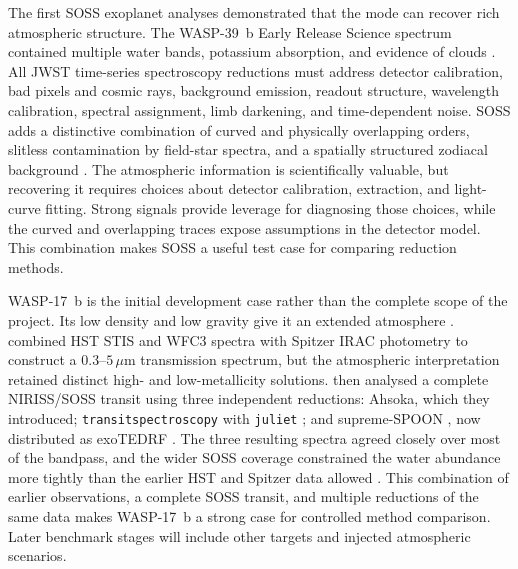
The first SOSS exoplanet analyses demonstrated that the mode can recover rich
atmospheric structure. The WASP-39~b Early Release Science spectrum contained
multiple water bands, potassium absorption, and evidence of clouds
\citep{FeinsteinEtAl2023}. All JWST time-series spectroscopy reductions must
address detector calibration, bad pixels and cosmic rays, background emission,
readout structure, wavelength calibration, spectral assignment, limb darkening,
and time-dependent noise. SOSS adds a distinctive combination of curved and
physically overlapping orders, slitless contamination by field-star spectra,
and a spatially structured zodiacal background
\citep{BellEtAl2022,RadicaEtAl2023,HolmbergMadhusudhan2023}. The atmospheric information is
scientifically valuable, but recovering it requires choices about detector
calibration, extraction, and light-curve fitting. Strong signals provide
leverage for diagnosing those choices, while the curved and overlapping traces
expose assumptions in the detector model. This combination makes SOSS a useful
test case for comparing reduction methods.


WASP-17~b is the initial development case rather than the complete scope of the
project. Its low density and low gravity give it an extended atmosphere
\citep{AndersonEtAl2010}. \citet{AldersonEtAl2022} combined HST STIS and WFC3
spectra with Spitzer IRAC photometry to construct a
$0.3$--$5\,\mu\mathrm{m}$ transmission spectrum, but the atmospheric
interpretation retained distinct high- and low-metallicity solutions.
\citet{LouieEtAl2025} then analysed a complete NIRISS/SOSS transit using three
independent reductions: Ahsoka, which they introduced;
\texttt{transitspectroscopy} \citep{Espinoza2022TransitSpectroscopy} with
\texttt{juliet} \citep{EspinozaEtAl2019}; and supreme-SPOON
\citep{RadicaEtAl2023}, now distributed as exoTEDRF \citep{Radica2024}. The
three resulting spectra agreed closely over most of the bandpass, and the wider
SOSS coverage constrained the water abundance more tightly than the earlier HST
and Spitzer data allowed \citep{LouieEtAl2025}. This combination of earlier observations, a complete
SOSS transit, and multiple reductions of the same data makes WASP-17~b a strong
case for controlled method comparison. Later benchmark stages will include
other targets and injected atmospheric scenarios.

